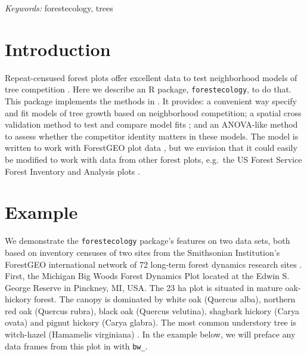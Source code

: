 \documentclass[12pt]{article}
\begin{document}
\noindent%
{\it Keywords:} forestecology, trees
\vfill

\newpage
{} %

\hypertarget{introduction}{%
\section{Introduction}\label{introduction}}

Repeat-censused forest plots offer excellent data to test neighborhood
models of tree competition \citet{allen_permutation_2020}
\citet{canham_neighborhood_2006} \citet{uriarte_spatially_2004}. Here we
describe an R package, \texttt{forestecology}, to do that. This package
implements the methods in \citet{allen_permutation_2020}. It provides: a
convenient way specify and fit models of tree growth based on
neighborhood competition; a spatial cross validation method to test and
compare model fits \citet{roberts_cross-validation_2017}; and an
ANOVA-like method to assess whether the competitor identity matters in
these models. The model is written to work with ForestGEO plot data
\citet{andersonteixeira_ctfs-forestgeo_2015}, but we envision that it
could easily be modified to work with data from other forest plots,
e.g.~the US Forest Service Forest Inventory and Analysis plots
\citet{smith_forest_2002}.

\hypertarget{example}{%
\section{Example}\label{example}}

We demonstrate the \texttt{forestecology} package's features on two data
sets, both based on inventory censuses of two sites from the Smithsonian
Institution's ForestGEO international network of 72 long‐term forest
dynamics research sites \citet{andersonteixeira_ctfs-forestgeo_2015}.
First, the Michigan Big Woods Forest Dynamics Plot located at the Edwin
S. George Reserve in Pinckney, MI, USA. The 23 ha plot is situated in
mature oak-hickory forest. The canopy is dominated by white oak (Quercus
alba), northern red oak (Quercus rubra), black oak (Quercus velutina),
shagbark hickory (Carya ovata) and pignut hickory (Carya glabra). The
most common understory tree is witch-hazel (Hamamelis virginiana)
\citet{allen_michigan_2020}. In the example below, we will preface any
data frames from this plot in with \texttt{bw\_}.
\end{document}
